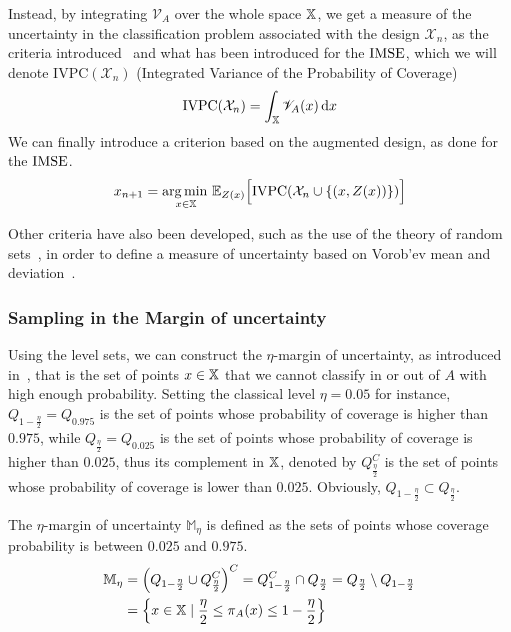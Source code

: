 \documentclass[../../Main_ManuscritThese.tex]{subfiles}
\begin{document}
Instead, by integrating $\mathscr{V}_A$ over the whole space $\mathbb{X}$, we get a measure of the uncertainty in the classification problem associated with the design $\mathcal{X}_n$, as the criteria introduced~\cite{bect_sequential_2012} and what has been introduced for the $\operatorname{\mathrm{IMSE}}$, which we will denote $\mathrm{IVPC}(\mathcal{X}_n)$ (Integrated Variance of the Probability of Coverage)
\begin{equation}
  \label{eq:IVPC_def}
\mathrm{IVPC}(\mathcal{X}_n) =  \int_{\mathbb{X}} \mathscr{V}_A(x)\,\mathrm{d}x
\end{equation}
We can finally introduce a criterion based on the augmented design, as done for the $\operatorname{\mathrm{IMSE}}$.
\begin{equation}
  \label{eq:expected_aIVPC}
  x_{n+1} = \operatorname*{arg\,min \,}_{x \in\mathbb{X}} \mathbb{E}_{Z(x)}\Big[\mathrm{IVPC}(\mathcal{X}_n \cup \{   \left(x, Z(x) \right)  \})\Big]
\end{equation}

Other criteria have also been developed, such as the use of the theory of random sets~\cite{el_amri_data-driven_2019}, in order to define a measure of uncertainty based on Vorob'ev mean and deviation~\cite{vorobyev_new_2003}.


\subsubsection{Sampling in the Margin of uncertainty}
\label{sec:margin_of_uncertainty}

Using the level sets, we can construct the $\eta$-margin of uncertainty, as introduced in~\cite{dubourg_reliability-based_2011}, that is the set of points $x \in \mathbb{X}$ that we cannot classify in or out of $A$ with high enough probability.
Setting the classical level $\eta=0.05$ for instance, $Q_{1-\frac{\eta}{2}}=Q_{0.975}$ is the set of points whose probability of coverage is higher than $0.975$, while $Q_{\frac{\eta}{2}}=Q_{0.025}$ is the set of points whose probability of coverage is higher than $0.025$, thus its complement in $\mathbb{X}$, denoted by $Q_{\frac{\eta}{2}}^C$ is the set of points whose probability of coverage is lower than $0.025$. Obviously, $Q_{1-\frac{\eta}{2}} \subset Q_{\frac{\eta}{2}}$.

The $\eta$-margin of uncertainty $\mathbb{M}_{\eta}$ is defined as the sets of points whose coverage probability is between $0.025$ and $0.975$.
\begin{align}
  \label{eq:margin_unc}
  \mathbb{M}_{\eta} &= \left(Q_{1-\frac{\eta}{2}} \cup Q^C_{\frac{\eta}{2}} \right)^C = Q_{1-\frac{\eta}{2}}^C \cap Q_{\frac{\eta}{2}} = Q_{\frac{\eta}{2}} \setminus Q_{1-\frac{\eta}{2}} \\
                    &= \left\{x \in \mathbb{X} \mid \frac{\eta}{2} \leq \pi_A(x) \leq 1 - \frac{\eta}{2} \right\}
\end{align}
\end{document}
